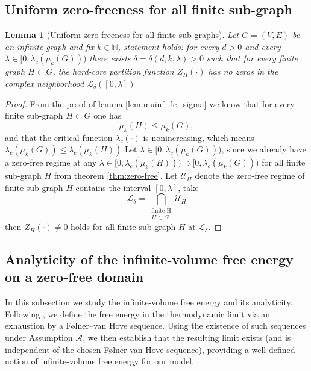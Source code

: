 \documentclass[a4paper,11pt]{article}
\theoremstyle{plain}
\newtheorem{lemma}[theorem]{Lemma}
\theoremstyle{definition}
\theoremstyle{remark}
\newcommand{\1}{\mathbf{1}}
\begin{document}
\subsection{Uniform zero-freeness for all finite sub-graph}

\begin{lemma}[Uniform zero-freeness for all finite sub-graphs]
\label{lem:uniform_zerofree_all_finite_subgraphs}
Let $G=(V,E)$ be an infinite graph and fix $k\in\mathbb{N}$, statement holds:
for every $d>0$ and every $\lambda\in[0,\lambda_c(\mu_k(G)))$ there exists $\delta=\delta(d,k,\lambda)>0$
such that for every finite graph $H\subset G$,
the hard-core partition function $Z_H(\cdot)$ has no zeros in the complex neighborhood $\mathcal{L}_{\delta}([0,\lambda])$
\end{lemma}

\begin{proof}
    From the proof of lemma \ref{lem:muinf_le_sigma} we know that for every finite sub-graph $H\subset G$ one has
    $$\mu_k(H)\le \mu_k(G),$$
    and that the critical function $\lambda_c(\cdot)$ is nonincreasing, which means $\lambda_c(\mu_k(G))\le\lambda_c(\mu_k(H))$
    Let $\lambda\in[0,\lambda_c(\mu_k(G)))$, since we already have a zero-free regime at any $\lambda\in[0,\lambda_c(\mu_k(H)))\supset[0,\lambda_c(\mu_k(G)))$ for all finite sub-graph $H$ from theorem \ref{thm:zero-free}. Let $\mathcal{U}_H$ denote the zero-free regime of finite sub-graph $H$ contains the interval $[0,\lambda]$, take
    $$\mathcal{L}_{\delta}=\bigcap_{\substack{\text{finite H}\\H\subset G}}\mathcal{U}_H$$
    then $Z_H(\cdot)\neq0$ holds for all finite sub-graph $H$ at $\mathcal{L}_{\delta}$.
\end{proof}


\subsection{Analyticity of the infinite-volume free energy on a zero-free domain}

In this subsection we study the infinite-volume free energy and its analyticity. 
Following \cite{scott2005repulsive}, we define the free energy in the thermodynamic limit via an exhaustion by a Følner--van Hove sequence. 
Using the existence of such sequences under Assumption $\mathcal{A}$, we then establish that the resulting limit exists (and is independent of the chosen F\o lner-van Hove sequence), providing a well-defined notion of infinite-volume free energy for our model.
\end{document}
